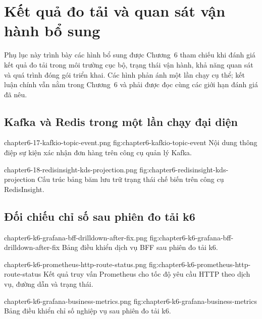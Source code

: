 \chapter{Kết quả đo tải và quan sát vận hành bổ sung}
\label{app:benchmark-observability-evidence}

Phụ lục này trình bày các hình bổ sung được Chương~6 tham chiếu khi đánh giá kết quả đo tải trong môi trường cục bộ, trạng thái vận hành, khả năng quan sát và quá trình đóng gói triển khai. Các hình phản ánh một lần chạy cụ thể; kết luận chính vẫn nằm trong Chương~6 và phải được đọc cùng các giới hạn đánh giá đã nêu.

\section{Kafka và Redis trong một lần chạy đại diện}

  {chapter6-17-kafkio-topic-event.png}
  {fig:chapter6-kafkio-topic-event}
  {Nội dung thông điệp sự kiện xác nhận đơn hàng trên công cụ quản lý Kafka.}

  {chapter6-18-redisinsight-kds-projection.png}
  {fig:chapter6-redisinsight-kds-projection}
  {Cấu trúc bảng băm lưu trữ trạng thái chế biến trên công cụ RedisInsight.}

\section{Đối chiếu chỉ số sau phiên đo tải k6}

  {chapter6-k6-grafana-bff-drilldown-after-fix.png}
  {fig:chapter6-k6-grafana-bff-drilldown-after-fix}
  {Bảng điều khiển dịch vụ BFF sau phiên đo tải k6.}

  {chapter6-k6-prometheus-http-route-status.png}
  {fig:chapter6-k6-prometheus-http-route-status}
  {Kết quả truy vấn Prometheus cho tốc độ yêu cầu HTTP theo dịch vụ, đường dẫn và trạng thái.}

  {chapter6-k6-grafana-business-metrics.png}
  {fig:chapter6-k6-grafana-business-metrics}
  {Bảng điều khiển chỉ số nghiệp vụ sau phiên đo tải k6.}

